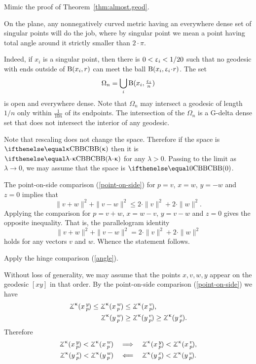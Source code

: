  Mimic the proof of Theorem~\ref{thm:almost.geod}.

On the plane, any nonnegatively curved metric having an everywhere dense set of singular points will do the job, where 
by singular point we mean a point having total angle around it strictly smaller than $2\cdot\pi$.

Indeed, if $x_i$ is a singular point, then there is $0<\upvarepsilon_i<1/20$ such that no geodesic with ends outside of $\mathrm{B}{}(x_i,r)$ can meet the ball $\oBall(x_i,\eps_i\cdot r)$.
The set 
\[\Omega_n=\bigcup_i \mathrm{B}{}(x_i,\tfrac{\upvarepsilon_i}n)\]
is open and everywhere dense.
Note that $\Omega_n$ may intersect a geodesic  of length $1/n$ only within $\frac 1 {10n}$  of its endpoints.
The intersection of the $\Omega_n$ is a G-delta dense set that does not intersect the interior of any geodesic.

Note that rescaling does not change the space.
Therefore if the space is $\Alex\kappa$ then it is $\Alex{\lambda\cdot\kappa}$ for any $\lambda>0$.
Passing to the limit as $\lambda\to 0$, we may assume that the space is $\Alex0$.

The point-on-side comparison (\ref{point-on-side}) for $p=v$, $x=w$, $y=-w$ and $z=0$ implies that 
\[\|v+w\|^2+\|v-w\|^2\le 2\cdot\|v\|^2+2\cdot\|w\|^2.\]
Applying the comparison for 
$p=v+w$, $x=w-v$, $y=v-w$ and $z=0$ gives the opposite inequality.
That is, the parallelogram identity
\[\|v+w\|^2+\|v-w\|^2= 2\cdot\|v\|^2+2\cdot\|w\|^2\]
holds for any vectors $v$ and $w$.
Whence the statement follows.

Apply the hinge comparison (\ref{angle}).

Without loss of generality, we may assume that the points $x,v,w,y$ appear on the geodesic $[xy]$ in that order.
By the point-on-side comparison (\ref{point-on-side}) we have
\begin{align*}
\angk\kappa xyp\le\angk\kappa xwp&\le \angk\kappa xvp,
\\
\angk\kappa ywp&\ge\angk\kappa yvp\ge\angk\kappa yxp.
\end{align*}
Therefore
\begin{align*}\angk\kappa xyp<\angk\kappa xwp
\quad&\Longrightarrow\quad
\angk\kappa xyp<\angk\kappa xvp,
\\
\angk\kappa yxp<\angk\kappa ywp
\quad&\Longleftarrow\quad
\angk\kappa yxp<\angk\kappa yvp.
\end{align*}

